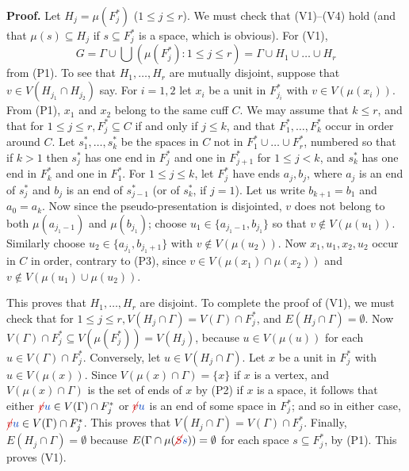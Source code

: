 \textbf{Proof.} Let $H_j = \mu(F_j^*)$ ($1 \le j \le r$). We must check that (V1)--(V4) hold (and that $\mu(s) \subseteq H_j$ if $s \subseteq F_j^*$ is a space, which is obvious). For (V1),
\begin{equation*}
G = \Gamma \cup \bigcup(\mu(F_j^*) : 1 \le j \le r) = \Gamma \cup H_1 \cup \dots \cup H_r
\end{equation*}
from (P1). To see that $H_1, \dots, H_r$ are mutually disjoint, suppose that $v \in V(H_{j_1} \cap H_{j_2})$ say. For $i = 1, 2$ let $x_i$ be a unit in $F_{j_i}^*$ with $v \in V(\mu(x_i))$. From (P1), $x_1$ and $x_2$ belong to the same cuff $C$. We may assume that $k \le r$, and that for $1 \le j \le r, F_j^* \subseteq C$ if and only if $j \le k$, and that $F_1^*, \dots, F_k^*$ occur in order around $C$. Let $s_1^*, \dots, s_k^*$ be the spaces in $C$ not in $F_1^* \cup \dots \cup F_r^*$, numbered so that if $k > 1$ then $s_j^*$ has one end in $F_j^*$ and one in $F_{j+1}^*$ for $1 \le j < k$, and $s_k^*$ has one end in $F_k^*$ and one in $F_1^*$. For $1 \le j \le k$, let $F_j^*$ have ends $a_j, b_j$, where $a_j$ is an end of $s_j^*$ and $b_j$ is an end of $s_{j-1}^*$ (or of $s_k^*$, if $j = 1$). Let us write $b_{k+1} = b_1$ and $a_0 = a_k$. Now since the pseudo-presentation is disjointed, $v$ does not belong to both $\mu(a_{j_1-1})$ and $\mu(b_{j_1})$; choose $u_1 \in \{a_{j_1-1}, b_{j_1}\}$ so that $v \notin V(\mu(u_1))$. Similarly choose $u_2 \in \{a_{j_1}, b_{j_1+1}\}$ with $v \notin V(\mu(u_2))$. Now $x_1, u_1, x_2, u_2$ occur in $C$ in order, contrary to (P3), since $v \in V(\mu(x_1) \cap \mu(x_2))$ and $v \notin V(\mu(u_1) \cup \mu(u_2))$.

This proves that $H_1, \dots, H_r$ are disjoint. To complete the proof of (V1), we must check that for $1 \le j \le r, V(H_j \cap \Gamma) = V(\Gamma) \cap F_j^*$, and $E(H_j \cap \Gamma) = \emptyset$. Now $V(\Gamma) \cap F_j^* \subseteq V(\mu(F_j^*)) = V(H_j)$, because $u \in V(\mu(u))$ for each $u \in V(\Gamma) \cap F_j^*$. Conversely, let $u \in V(H_j \cap \Gamma)$. Let $x$ be a unit in $F_j^*$ with $u \in V(\mu(x))$. Since $V(\mu(x) \cap \Gamma) = \{x\}$ if $x$ is a vertex, and $V(\mu(x) \cap \Gamma)$ is the set of ends of $x$ by (P2) if $x$ is a space, it follows that either $\delm{v}\fix{u} \in V(\Gamma) \cap F_j^*$ or $\delm{v}\fix{u}$ is an end of some space in $F_j^*$; and so in either case, $\delm{v}\fix{u} \in V(\Gamma) \cap F_j^*$. This proves that $V(H_j \cap \Gamma) = V(\Gamma) \cap F_j^*$. Finally, $E(H_j \cap \Gamma) = \emptyset$ because $E(\Gamma \cap \mu(\delm{S}\fix{s})) = \emptyset$ for each space $s \subseteq F_j^*$, by (P1). This proves (V1).


